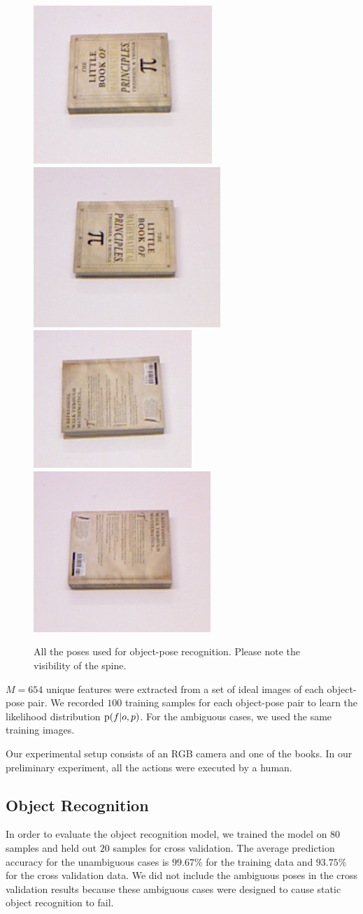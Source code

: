     
     \begin{figure}
     \centering
    		\includegraphics[height = 0.2\columnwidth]{pics/math_cover1.jpg}
    		\includegraphics[height = 0.2\columnwidth]{pics/math_cover1_rot.jpg}
    		\includegraphics[height = 0.2\columnwidth]{pics/math_down.jpg}
    		\includegraphics[height = 0.2\columnwidth]{pics/math_down_rot.jpg}
    		\caption{All the poses used for object-pose recognition. Please note the visibility of the spine.}
	\label{fig:pose_dataset}
    \end{figure}       
    
    
$M = 654$ unique features were extracted from a set of ideal images of each object-pose pair. We recorded $100$ training samples for each object-pose pair to learn the likelihood distribution $\text{p}(f|o,p)$. For the ambiguous cases, we used the same training images.

    Our experimental setup consists of an RGB camera and one of the books. In our preliminary experiment, all the actions were executed by a human.

    \subsection{Object Recognition}
    
	In order to evaluate the object recognition model, we trained the model on $80$ samples and held out $20$ samples for cross validation. The average prediction accuracy for the unambiguous cases is $99.67\%$ for the training data and $93.75\%$ for the cross validation data. We did not include the ambiguous poses in the cross validation results because these ambiguous cases were designed to cause static object recognition to fail. %
    
